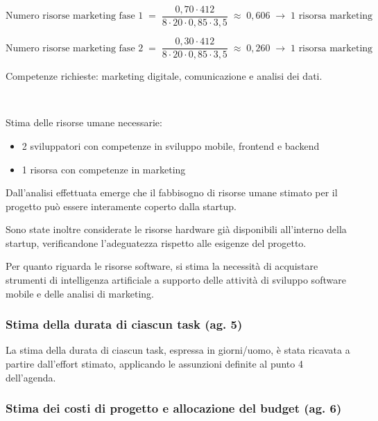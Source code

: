 \documentclass[11pt,a4paper]{article}
\providecommand{\tightlist}{\setlength{\itemsep}{0pt}\setlength{\parskip}{0pt}}
\begin{document}
{}

\[ \text{Numero risorse marketing fase 1} \;=\; \frac{0{,}70 \cdot 412}{8 \cdot 20 \cdot 0{,}85 \cdot 3{,}5} \;\approx\; 0{,}606 \;\rightarrow\; 1 \text{ risorsa marketing} \]

{}

{}

\[ \text{Numero risorse marketing fase 2} \;=\; \frac{0{,}30 \cdot 412}{8 \cdot 20 \cdot 0{,}85 \cdot 3{,}5} \;\approx\; 0{,}260 \;\rightarrow\; 1 \text{ risorsa marketing} \]

{}

{Competenze richieste: marketing digitale, comunicazione e analisi dei dati. }

{~}

{Stima delle risorse umane necessarie:}

\begin{itemize}
\tightlist
\item
  {2 sviluppatori con competenze in sviluppo mobile, frontend e backend}
\item
  {1 risorsa con competenze in marketing}
\end{itemize}

{}

{}

{Dall’analisi effettuata emerge che il fabbisogno di risorse umane stimato per il progetto può essere interamente coperto dalla startup.}

{}

{Sono state inoltre considerate le risorse hardware già disponibili all’interno della startup, verificandone l’adeguatezza rispetto alle esigenze del progetto.}

{Per quanto riguarda le risorse software, si stima la necessità di acquistare strumenti di intelligenza artificiale a supporto delle attività di sviluppo software mobile e delle analisi di marketing.}

\subsubsection{\texorpdfstring{{Stima della durata di ciascun task (ag. 5)}}{Stima della durata di ciascun task (ag. 5)}}\label{h.ufg7psybxgew}

{La stima della durata di ciascun task, espressa in giorni/uomo, è stata ricavata a partire dall’effort stimato, applicando le assunzioni definite al punto 4 dell’agenda.}

\subsubsection{\texorpdfstring{{Stima dei costi di progetto e allocazione del budget (ag. 6)}}{Stima dei costi di progetto e allocazione del budget (ag. 6)}}\label{h.turmc49m82s}
\end{document}
